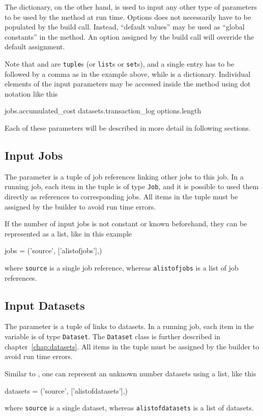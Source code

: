 The \options dictionary, on the other hand, is used to input any other
type of parameters to be used by the method at run time.  Options does
not necessarily have to be populated by the build call.  Instead,
``default values'' may be used as ``global constants'' in the method.
An option assigned by the build call will override the default
assignment.

Note that \jobs and \datasets are \texttt{tuple}s (or \texttt{list}s
or \texttt{set}s), and a single entry has to be followed by a comma as
in the example above, while \options is a dictionary.  Individual
elements of the input parameters may be accessed inside the method
using dot notation like this
\begin{python}
jobs.accumulated_cost
datasets.transaction_log
options.length
\end{python}
Each of these parameters will be described in more detail in following
sections.


\subsection{Input Jobs}
The \jobs parameter is a tuple of job references linking other jobs to
this job.  In a running job, each item in the \jobs tuple is of
type \texttt{Job}, and it is possible to used them directly as
references to corresponding jobs.  All items in the \jobs tuple must
be assigned by the builder to avoid run time errors.

If the number of input jobs is not constant or known beforehand, they
can be represented as a list, like in this example
\begin{python}
jobs = ('source', ['alistofjobs'],)
\end{python}
where \texttt{source} is a single job reference, whereas
\texttt{alistofjobs} is a list of job references.


\subsection{Input Datasets}
The \datasets parameter is a tuple of links to datasets.  In a running
job, each item in the \datasets variable is of type
\texttt{Dataset}.  The \texttt{Dataset} class is further described in
chapter~\ref{chap:datasets}.  All items in the \datasets tuple must be
assigned by the builder to avoid run time errors.

Similar to \jobs, one can represent an unknown number datasets using a
list, like this
\begin{python}
datasets = ('source', ['alistofdatasets'],)
\end{python}
where \texttt{source} is a single dataset, whereas
\texttt{alistofdatasets} is a list of datasets.



